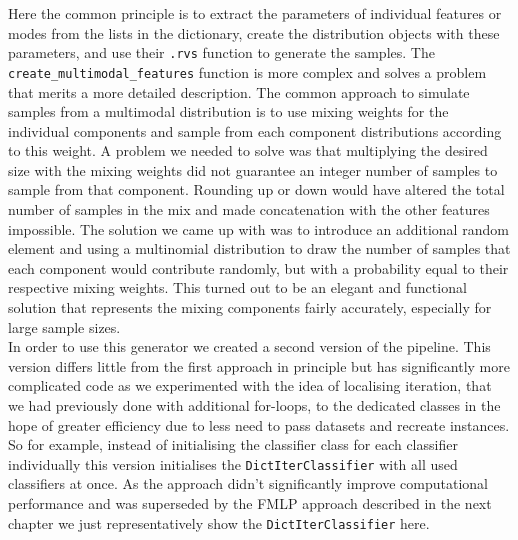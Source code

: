 Here the common principle is to extract the parameters of individual features or modes from the lists in the dictionary, create the distribution objects with these parameters,
and use their \texttt{.rvs} function to generate the samples.
The \texttt{create\_multimodal\_features} function is more complex and solves a problem that merits a more detailed description.
The common approach to simulate samples from a multimodal distribution is to use mixing weights for the individual components 
and sample from each component distributions according to this weight. 
A problem we needed to solve was that multiplying the desired size with the mixing weights did not guarantee an integer number of samples to sample from that component.
Rounding up or down would have altered the total number of samples in the mix and made concatenation with the other features impossible.
The solution we came up with was to introduce an additional random element and using a multinomial distribution to draw the number of samples
that each component would contribute randomly, but with a probability equal to their respective mixing weights.
This turned out to be an elegant and functional solution that represents the mixing components fairly accurately, especially for large sample sizes. \\

In order to use this generator we created a second version of the pipeline. 
This version differs little from the first approach in principle but has significantly more complicated code as we experimented with the idea of localising iteration, 
that we had previously done with additional for-loops, to the dedicated classes in the hope of greater efficiency due to less need to pass datasets and recreate instances.
So for example, instead of initialising the classifier class for each classifier individually this version initialises the \texttt{DictIterClassifier} with all used classifiers at once.
As the approach didn't significantly improve computational performance and was superseded by the FMLP approach described in the next chapter
we just representatively show the \texttt{DictIterClassifier} here.

